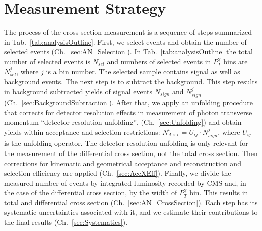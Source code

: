 \section{Measurement Strategy}
\label{sec:AN_WgMeasStrategy}

The process of the cross section measurement is a sequence of steps summarized in Tab.~\ref{tab:analysisOutline}. First, we select events and obtain the number of selected events (Ch.~\ref{sec:AN_Selection}). In Tab.~\ref{tab:analysisOutline} the total number of selected events is $N_{sel}$ and numbers of selected events in $P_T^{\gamma}$ bins are $N_{sel}^j$, where $j$ is a bin number. The selected sample contains signal as well as background events. The next step is to subtract the background. This step results in background subtracted yields of signal events $N_{sign}$ and $N_{sign}^j$ (Ch.~\ref{sec:BackgroundSubtraction}). After that, we apply an unfolding procedure that corrects for detector resolution effects in measurement of photon transverse momentum ``detector resolution unfolding'', (Ch.~\ref{sec:Unfolding}) and obtain yields within acceptance and selection restrictions: $N_{A\times\epsilon}^i = U_{ij} \cdot N_{sign}^j$, where $U_{ij}$ is the unfolding operator. The detector resolution unfolding is only relevant for the measurement of the differential cross section, not the total cross section. Then corrections for kinematic and geometrical acceptance and reconstruction and selection efficiency are applied (Ch.~\ref{sec:AccXEff}). Finally, we divide the measured number of events by integrated luminosity recorded by CMS and, in the case of the differential cross section, by the width of $P_T^{\gamma}$ bin. This results in total and differential cross section (Ch.~\ref{sec:AN_CrossSection}). Each step has its systematic uncertainties associated with it, and we estimate their contributions to the final results (Ch.~\ref{sec:Systematics}).

